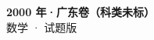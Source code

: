 \documentclass[zihao=-4, a4paper]{ctexart}
\begin{document}
\begin{center}
  {\Large\bfseries 2000 年·广东卷（科类未标）}\\[4pt]
  {\large 数学 · 试题版}
\end{center}
\medskip
{}

\end{document}
